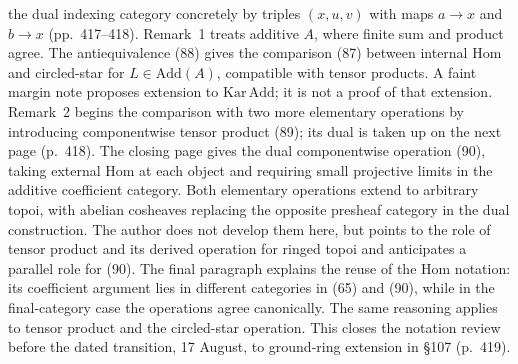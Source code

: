 the dual indexing category concretely by triples $(x,u,v)$ with maps $a\to x$ and $b\to x$ (pp.\ 417--418). Remark~1 treats additive $A$, where finite sum and product agree. The antiequivalence (88) gives the comparison (87) between internal Hom and circled-star for $L\in\mathrm{Add}(A)$, compatible with tensor products. A faint margin note proposes extension to $\mathrm{Kar}\,\mathrm{Add}$; it is not a proof of that extension. Remark~2 begins the comparison with two more elementary operations by introducing componentwise tensor product (89); its dual is taken up on the next page (p.\ 418). The closing page gives the dual componentwise operation (90), taking external Hom at each object and requiring small projective limits in the additive coefficient category. Both elementary operations extend to arbitrary topoi, with abelian cosheaves replacing the opposite presheaf category in the dual construction. The author does not develop them here, but points to the role of tensor product and its derived operation for ringed topoi and anticipates a parallel role for (90). The final paragraph explains the reuse of the Hom notation: its coefficient argument lies in different categories in (65) and (90), while in the final-category case the operations agree canonically. The same reasoning applies to tensor product and the circled-star operation. This closes the notation review before the dated transition, 17 August, to ground-ring extension in \S107 (p.\ 419).

